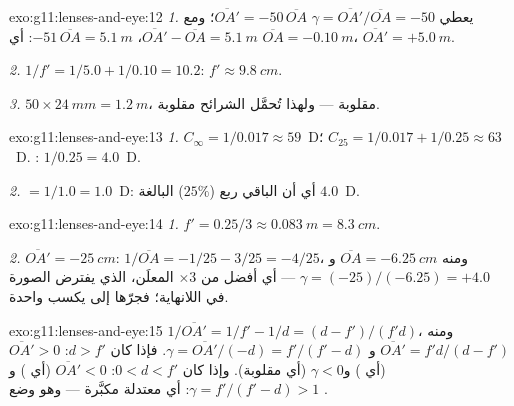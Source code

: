 \begin{solution}{exo:g11:lenses-and-eye:12}
\emph{1.} يعطي $\gamma = \overline{OA'}/\overline{OA} = -50$
$\overline{OA'} = -50\,\overline{OA}$؛ ومع
$\overline{OA'} - \overline{OA} = \qty{5.1}{m}$،
$-51\,\overline{OA} = \qty{5.1}{m}$: أي $\overline{OA} = \qty{-0.10}{m}$،
$\overline{OA'} = +\qty{5.0}{m}$.

\emph{2.} $1/f' = 1/5.0 + 1/0.10 = 10.2$: $f' \approx \qty{9.8}{cm}$.

\emph{3.} $50 \times \qty{24}{mm} = \qty{1.2}{m}$، مقلوبة --- ولهذا
تُحمَّل الشرائح مقلوبة.
\end{solution}

\begin{solution}{exo:g11:lenses-and-eye:13}
\emph{1.} $C_\infty = 1/0.017 \approx 59$~D؛
$C_{25} = 1/0.017 + 1/0.25 \approx 63$~D. :
$1/0.25 = 4.0$~D.

\emph{2.}  $= 1/1.0 = 1.0$~D: أي أن الباقي ربع ($25\%$)
  البالغة $4.0$~D.
\end{solution}

\begin{solution}{exo:g11:lenses-and-eye:14}
\emph{1.} $f' = 0.25/3 \approx \qty{0.083}{m} = \qty{8.3}{cm}$.

\emph{2.} $\overline{OA'} = \qty{-25}{cm}$:
$1/\overline{OA} = -1/25 - 3/25 = -4/25$، ومنه
$\overline{OA} = \qty{-6.25}{cm}$ و
$\gamma = (-25)/(-6.25) = +4.0$ --- أي أفضل من $\times 3$
المعلَن، الذي يفترض الصورة في اللانهاية؛ فجرّها إلى
 يكسب  واحدة.
\end{solution}

\begin{solution}{exo:g11:lenses-and-eye:15}
$1/\overline{OA'} = 1/f' - 1/d = (d - f')/(f'd)$، ومنه
$\overline{OA'} = f'd/(d - f')$ و
$\gamma = \overline{OA'}/(-d) = f'/(f' - d)$. فإذا كان $d > f'$:
$\overline{OA'} > 0$ (أي ) و$\gamma < 0$ (أي مقلوبة). وإذا كان
$0 < d < f'$: $\overline{OA'} < 0$ (أي ) و
$\gamma = f'/(f' - d) > 1$: أي معتدلة مكبَّرة --- وهو وضع
.
\end{solution}

